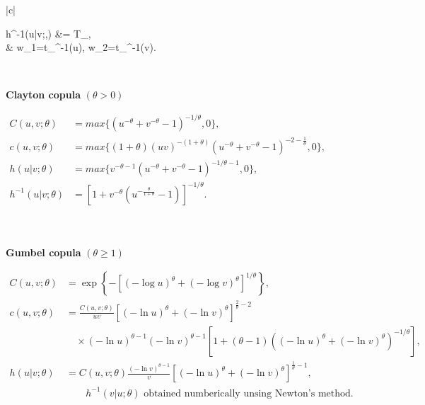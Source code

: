 \documentclass[12pt,oneside,a4paper]{book}
\theoremstyle{definition}
\theoremstyle{remark}
\begin{document}
\begin{table}[H]
\begin{tabular}{|c|}
\begin{aligned}
					h^{-1}(u|v;\theta,\nu)
					&=
					T_\nu{},\\[2pt]

					&\qquad
					w_1=t_\nu^{-1}(u),\quad
					w_2=t_\nu^{-1}(v).
				\end{aligned}\)

				\\
				\hline


				\textbf{Clayton copula}
				$\left(\theta>0\right)$
				\\
				\hline

				\(\begin{aligned}
					C(u,v;\theta)
					&= max \{ \left(u^{-\theta}+v^{-\theta}-1 \right)^{-1/\theta}, 0 \},\\[2pt]

					c(u,v;\theta)
					&= max \{
					(1+\theta)
					(uv)^{-(1+\theta)}
					\left(
					u^{-\theta}+v^{-\theta}-1
					\right)^{-2-\frac{1}{\theta}}, 0 \},\\[2pt]

					h(u|v;\theta)
					&= max \{
					v^{-\theta-1}
					\left(
					u^{-\theta}+v^{-\theta}-1
					\right)^{-1/\theta-1}, 0 \},\\[2pt]

					h^{-1}(u|v;\theta)
					&=
					\left[
					1+
					v^{-\theta}
					\left(
					u^{-\frac{\theta}{1+\theta}}-1
					\right)
					\right]^{-1/\theta}.\\[2pt]
				\end{aligned}\)

				\\
				\hline


				\textbf{Gumbel copula}
				$\left(\theta\geq1\right)$
				\\
				\hline

				\(\begin{aligned}
					C(u,v;\theta)
					&=
					\exp\left\{
					-\left[
					(-\log u)^\theta+
					(-\log v)^\theta
					\right]^{1/\theta}
					\right\},\\[2pt]
					c(u,v;\theta)
					&=
					\frac{C(u,v;\theta)}{uv}
					\left[
					(-\ln u)^\theta+
					(-\ln v)^\theta
					\right]^{\frac{2}{\theta}-2}\\
					&\quad\times
					(-\ln u)^{\theta-1}
					(-\ln v)^{\theta-1}
					\left[
					1+
					(\theta-1)
					\left(
					(-\ln u)^\theta+
					(-\ln v)^\theta
					\right)^{-1/\theta}
					\right],\\[2pt]
					h(u|v;\theta)
					&=
					C(u,v;\theta)
					\frac{
						(-\ln v)^{\theta-1}
					}{
						v
					}
					\left[
					(-\ln u)^\theta+
					(-\ln v)^\theta
					\right]^{\frac{1}{\theta}-1},\\[2pt]
					&\qquad
					h^{-1}(v|u;\theta) \text{ obtained numberically unsing Newton's method}.
				\end{aligned}\)


\end{tabular}
\end{table}
\end{document}
